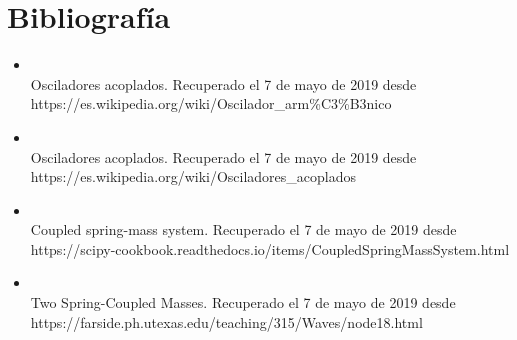 \documentclass[letterpaper,12pt]{article}
\begin{document}
\section*{Bibliografía}
\begin{itemize}
\item \\Osciladores acoplados. Recuperado el 7 de mayo de 2019 desde \\https://es.wikipedia.org/wiki/Oscilador\_arm\%C3\%B3nico
\\

\item \\Osciladores acoplados. Recuperado el 7 de mayo de 2019 desde \\https://es.wikipedia.org/wiki/Osciladores\_acoplados
\\

\item \\Coupled spring-mass system. Recuperado el 7 de mayo de 2019 desde \\https://scipy-cookbook.readthedocs.io/items/CoupledSpringMassSystem.html
\\

\item \\Two Spring-Coupled Masses. Recuperado el 7 de mayo de 2019 desde \\https://farside.ph.utexas.edu/teaching/315/Waves/node18.html
\\

\end{itemize}
\end{document}
